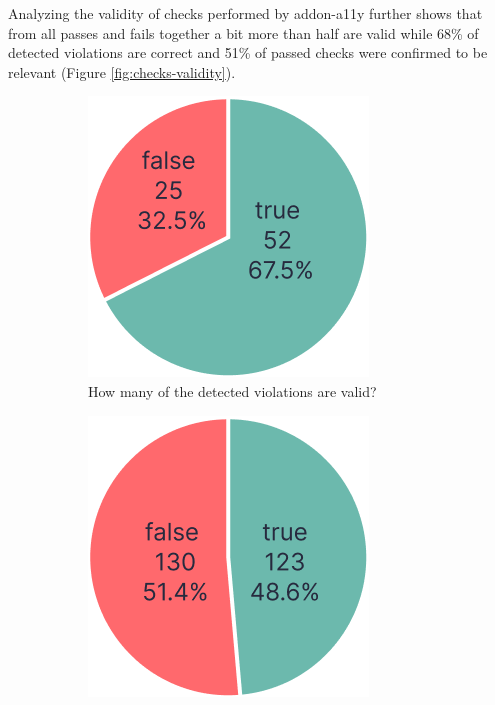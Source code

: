 \documentclass{master_thesis}
\begin{document}
Analyzing the validity of checks performed by addon-a11y further shows that from all passes and fails together a bit more than half are valid while 68\% of detected violations are correct and 51\% of passed checks were confirmed to be relevant (Figure \ref{fig:checks-validity}).

\begin{figure}[ht]
	\centering
	\begin{subfigure}{0.3\textwidth}
	\includegraphics[width=\textwidth]{img/violations.png}
	\caption{How many of the detected violations are valid?}
	\label{fig:checks-validity-failed}
	\end{subfigure}
	\hspace{0.03\textwidth}
	\begin{subfigure}{0.3\textwidth}
	\includegraphics[width=\textwidth]{img/passes.png}

\end{subfigure}
\end{figure}
\end{document}
